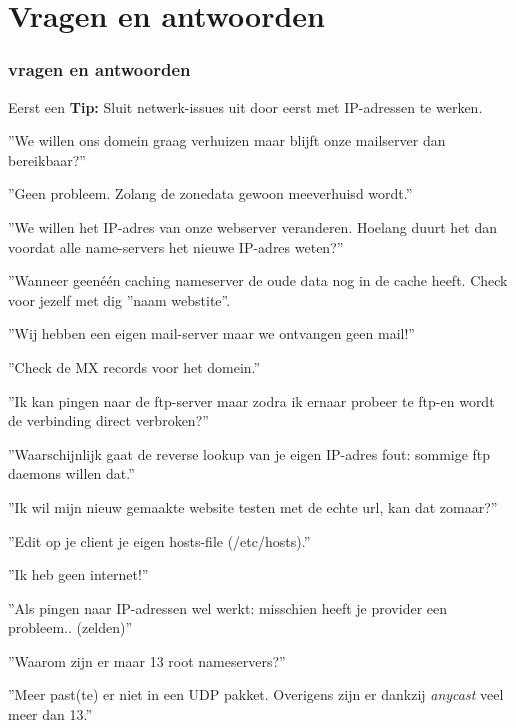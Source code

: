 \section{Vragen en antwoorden}
\begin{styleframe}
        \frametitle{vragen en antwoorden}
Eerst een {\bf Tip:} Sluit netwerk-issues uit door eerst met IP-adressen te werken.
\pause
{\scriptsize
\begin{description}[Q]
	\item[Q] ''We willen ons domein graag verhuizen maar blijft onze mailserver dan bereikbaar?''
	\pause
	\item[A] ''Geen probleem. Zolang de zonedata gewoon meeverhuisd wordt.''
	\pause
	\item[Q] ''We willen het IP-adres van onze webserver veranderen. Hoelang duurt het dan voordat alle name-servers het nieuwe IP-adres weten?''
	\pause
	\item[A] ''Wanneer geen\'e\'en caching nameserver de oude data nog in de cache heeft. Check voor jezelf met dig ''naam webstite''.
	\pause
	\item[Q] ''Wij hebben een eigen mail-server maar we ontvangen geen mail!''
	\pause
	\item[A] ''Check de MX records voor het domein.''
	\pause
	\item[Q] ''Ik kan pingen naar de ftp-server maar zodra ik ernaar probeer te ftp-en wordt de verbinding direct verbroken?''
	\pause
	\item[A] ''Waarschijnlijk gaat de reverse lookup van je eigen IP-adres fout: sommige ftp daemons willen dat.''
	\pause
	\item[Q] ''Ik wil mijn nieuw gemaakte website testen met de echte url, kan dat zomaar?''
	\pause
	\item[A] ''Edit op je client je eigen hosts-file (/etc/hosts).''
	\pause
	\item[Q] ''Ik heb geen internet!''
	\pause
	\item[A] ''Als pingen naar IP-adressen wel werkt: misschien heeft je provider een probleem.. (zelden)''
	\pause
	\item[Q] ''Waarom zijn er maar 13 root nameservers?''
	\pause
	\item[A] ''Meer past(te) er niet in een UDP pakket. Overigens zijn er dankzij {\it anycast} veel meer dan 13.''
\end{description}
}
\end{styleframe}

